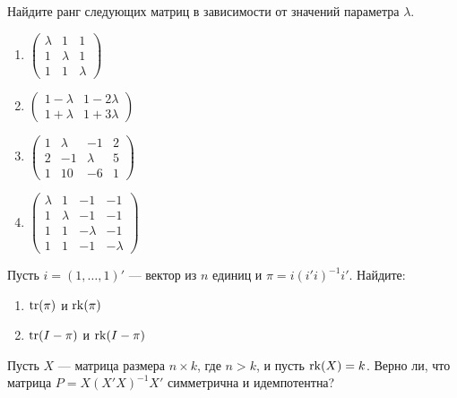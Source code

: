 \documentclass[pdftex,11pt,openany]{book}\usepackage[]{graphicx}\usepackage[]{color}
\begin{document}
\begin{problem}
Найдите ранг следующих матриц в зависимости от значений параметра $\lambda$.

\begin{enumerate}
\item $\begin{pmatrix} \lambda & 1 & 1 \\ 1 & \lambda & 1 \\ 1 & 1 & \lambda \end{pmatrix}$
\item $\begin{pmatrix} 1-\lambda & 1-2\lambda \\ 1+\lambda & 1+3\lambda \end{pmatrix}$
\item $\begin{pmatrix} 1 & \lambda & -1 & 2 \\ 2 & -1 & \lambda & 5 \\ 1 & 10 & -6 & 1 \end{pmatrix}$
\item $\begin{pmatrix} \lambda & 1 & -1 & -1 \\ 1 & \lambda & -1 & -1 \\ 1 & 1 & -\lambda & -1
\\ 1 & 1 & -1 & -\lambda \end{pmatrix}$
\end{enumerate}
\end{problem}


\begin{solution}
\end{solution}



\begin{problem}
Пусть $i = (1,\dots,1)'$ --- вектор из $n$ единиц и $\pi=i(i'i)^{-1}i'$. Найдите:
\begin{enumerate}
\item $\operatorname{tr}(\pi)$ и $\operatorname{rk}(\pi)$
\item $\operatorname{tr}(I-\pi)$ и $\operatorname{rk}(I-\pi)$
\end{enumerate}
\end{problem}

\begin{solution}
\end{solution}

\begin{problem}
Пусть $X$ --- матрица размера ${n \times k}$, где $n > k$, и пусть $\operatorname{rk}(X) = k$. Верно ли, что матрица $P = X(X'X)^{-1}X'$ симметрична и идемпотентна?
\end{problem}
\end{document}
